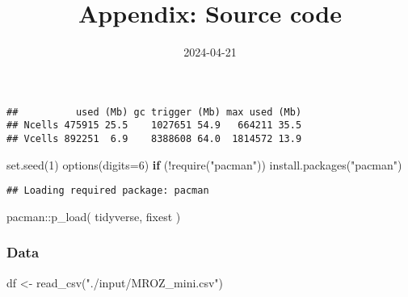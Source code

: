 \documentclass[
]{article}
\title{Appendix: Source code}
\author{}
\date{\vspace{-2.5em}2024-04-21}
\newenvironment{Shaded}{\begin{snugshade}}{\end{snugshade}}
\newcommand{\AttributeTok}[1]{\textcolor[rgb]{0.77,0.63,0.00}{#1}}
\newcommand{\ConstantTok}[1]{\textcolor[rgb]{0.00,0.00,0.00}{#1}}
\newcommand{\ControlFlowTok}[1]{\textcolor[rgb]{0.13,0.29,0.53}{\textbf{#1}}}
\newcommand{\DecValTok}[1]{\textcolor[rgb]{0.00,0.00,0.81}{#1}}
\newcommand{\FunctionTok}[1]{\textcolor[rgb]{0.00,0.00,0.00}{#1}}
\newcommand{\NormalTok}[1]{#1}
\newcommand{\OtherTok}[1]{\textcolor[rgb]{0.56,0.35,0.01}{#1}}
\newcommand{\SpecialCharTok}[1]{\textcolor[rgb]{0.00,0.00,0.00}{#1}}
\newcommand{\StringTok}[1]{\textcolor[rgb]{0.31,0.60,0.02}{#1}}
\begin{document}
\maketitle

\begin{Shaded}
\end{Shaded}

\begin{verbatim}
##          used (Mb) gc trigger (Mb) max used (Mb)
## Ncells 475915 25.5    1027651 54.9   664211 35.5
## Vcells 892251  6.9    8388608 64.0  1814572 13.9
\end{verbatim}

\begin{Shaded}
\begin{Highlighting}[]
\FunctionTok{set.seed}\NormalTok{(}\DecValTok{1}\NormalTok{)}
\FunctionTok{options}\NormalTok{(}\AttributeTok{digits=}\DecValTok{6}\NormalTok{) }
\ControlFlowTok{if}\NormalTok{ (}\SpecialCharTok{!}\FunctionTok{require}\NormalTok{(}\StringTok{"pacman"}\NormalTok{)) }\FunctionTok{install.packages}\NormalTok{(}\StringTok{"pacman"}\NormalTok{)}
\end{Highlighting}
\end{Shaded}

\begin{verbatim}
## Loading required package: pacman
\end{verbatim}

\begin{Shaded}
\begin{Highlighting}[]
\NormalTok{pacman}\SpecialCharTok{::}\FunctionTok{p\_load}\NormalTok{(}
\NormalTok{  tidyverse,}
\NormalTok{  fixest}
\NormalTok{)}
\end{Highlighting}
\end{Shaded}

\hypertarget{data}{%
\subsubsection{Data}\label{data}}

\begin{Shaded}
\begin{Highlighting}[]
\NormalTok{df }\OtherTok{\textless{}{-}} \FunctionTok{read\_csv}\NormalTok{(}\StringTok{"./input/MROZ\_mini.csv"}\NormalTok{)}
\end{Highlighting}
\end{Shaded}
\end{document}
